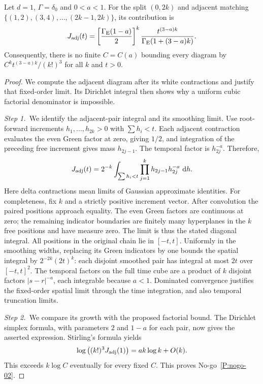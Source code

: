 \setcounter{nogo}{1}
\begin{nogo}
  \label{P:nogo-02}
  Let $d=1$, $\Gamma=\delta_0$ and $0<a<1$. For the split $(0,2k)$
  and adjacent matching $\{(1,2),(3,4),\ldots,(2k-1,2k)\}$, its contribution is
  \[
    J_{\rm adj}(t)=
    \left[\frac{\Gamma_{\mathrm E}(1-a)}2\right]^k
    \frac{t^{(3-a)k}}{\Gamma_{\mathrm E}(1+(3-a)k)}.
  \]
  Consequently, there is no finite $C=C(a)$ bounding every diagram by
  $C^k t^{(3-a)k}/(k!)^3$ for all $k$ and $t>0$.
\end{nogo}
\begin{proof}
  We compute the adjacent diagram after its white contractions and justify
  that fixed-order limit. Its Dirichlet integral then shows why a uniform
  cubic factorial denominator is impossible.


  \medskip
  \noindent\textit{Step 1.~}We identify the adjacent-pair integral and its
  smoothing limit.
  Use root-forward increments $h_1,\ldots,h_{2k}>0$ with
  $\sum h_i<t$. Each adjacent contraction evaluates the even Green factor
  at zero, giving $1/2$, and integration of the preceding free increment
  gives mass $h_{2j-1}$. The temporal factor is $h_{2j}^{-a}$. Therefore,
  \[
    J_{\rm adj}(t)=2^{-k}
    \int_{\sum h_i<t}\prod_{j=1}^k h_{2j-1}h_{2j}^{-a}\,\,\mathrm{d} h.
  \]
  Here delta contractions mean limits of Gaussian approximate identities.
  For completeness, fix $k$ and a strictly positive increment vector.
  After convolution the paired positions approach equality. The even Green
  factors are continuous at zero; the remaining indicator boundaries are
  finitely many hyperplanes in the $k$ free positions and have measure zero.
  The limit is thus the stated diagonal integral. All positions in the
  original chain lie in $[-t,t]$. Uniformly in the smoothing widths, replacing
  its Green indicators by one bounds the spatial integral by
  $2^{-2k}(2t)^k$: each disjoint smoothed pair has integral at most $2t$
  over $[-t,t]^2$. The temporal factors on the full time cube are a product
  of $k$ disjoint factors $|s-r|^{-a}$, each integrable because $a<1$.
  Dominated convergence justifies the fixed-order spatial limit through the
  time integration, and also temporal truncation limits.


  \medskip
  \noindent\textit{Step 2.~}We compare its growth with the proposed factorial
  bound.
  The Dirichlet simplex formula, with parameters $2$ and $1-a$ for each
  pair, now gives the asserted expression. Stirling's formula yields
  \[
    \log\big((k!)^3J_{\rm adj}(1)\big)=a k\log k+O(k).
  \]
  This exceeds $k\log C$ eventually for every fixed $C$.
  This proves No-go~\ref{P:nogo-02}.
\end{proof}

